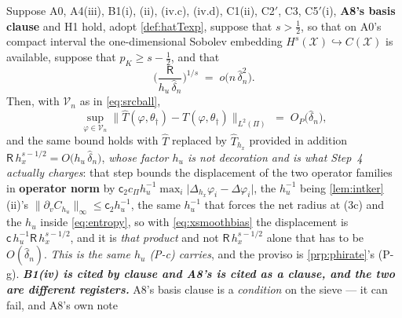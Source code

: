 \begin{lemma}\label{lem:unifop}
Suppose A0, A4(iii), B1(i), (ii), (iv.c), (iv.d), C1(ii), C2$'$, C3, C5$'$(i),
\textbf{A8's basis clause} and H1
hold, adopt \cref{def:hatTexp}, suppose that
$s>\tfrac12$, so that on A0's compact interval the one-dimensional Sobolev embedding
$H^{s}(\mathcal X)\hookrightarrow C(\mathcal X)$ is available, suppose that
$p_K\ge s-\tfrac12$, and
that
\begin{equation}\label{eq:entropy}
\Big(\frac{\mathsf R}{h_u\,\hat\delta_n}\Big)^{1/s}\;=\;o\big(n\,\hat\delta_n^{2}\big) .
\end{equation}
Then, with $\mathcal V_n$ as in \eqref{eq:srcball},
\begin{equation}\label{eq:unifop}
\sup_{\varphi\in\mathcal V_n}\big\|\hat T(\varphi,\theta_\dagger)-T(\varphi,\theta_\dagger)\big\|_{L^{2}(\Pi)}
\;=\;O_P\big(\hat\delta_n\big),
\end{equation}
and the same bound holds with $\hat T$ replaced by $\hat T_{h_x}$ provided in addition
$\mathsf R\,h_x^{s-1/2}=O\big(h_u\,\hat\delta_n\big)$, \emph{whose factor $h_u$ is not decoration and
is what Step~4 actually charges}: that step bounds the
displacement of the two operator families in \textbf{operator norm} by
$\mathsf c_2c_\Pi h_u^{-1}\max_{i}\big|\Delta_{h_x}\varphi_i-\Delta\varphi_i\big|$, the $h_u^{-1}$ being
\cref{lem:intker}\textup{(ii)}'s $\|\partial_vC_{h_u}\|_\infty\le\mathsf c_2h_u^{-1}$, the same
$h_u^{-1}$ that forces the net radius at \textup{(3c)} and the $h_u$ inside \eqref{eq:entropy}, so
with \eqref{eq:xsmoothbias} the displacement is $\mathsf c\,h_u^{-1}\mathsf R\,h_x^{s-1/2}$, and it is
\emph{that product} and not $\mathsf R\,h_x^{s-1/2}$ alone that has to be $O(\hat\delta_n)$.
\emph{This is the same $h_u$ (P-c) carries}, and the proviso is \cref{prp:phirate}'s (P-g).
\emph{\textbf{B1(iv) is cited by clause and A8's is cited as a clause, and the two are different
registers.}} A8's basis clause is a \emph{condition} on the sieve --- it can fail, and A8's own note

\end{lemma}
